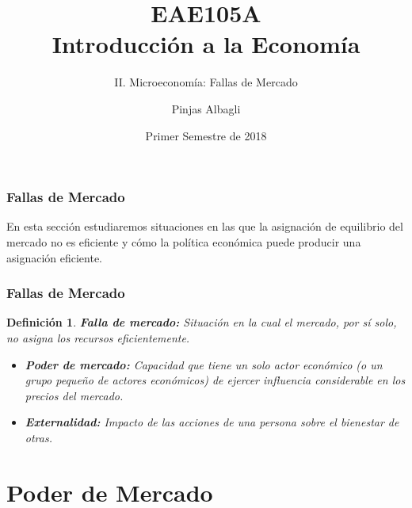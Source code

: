 \documentclass[dvipsnames,table,leqno]{beamer}
\title{EAE105A \\ Introducción a la Economía}
\subtitle{II. Microeconomía: Fallas de Mercado}
\author{Pinjas Albagli}
\institute{Instituto de Economía \\ Pontificia Universidad Católica de Chile}
\date{Primer Semestre de 2018}
\newtheorem{mydef}{Definición}
\begin{document}
	\maketitle 
	
		\begin{frame}
			\frametitle{Fallas de Mercado}
			En esta sección estudiaremos situaciones en las que la asignación de equilibrio del mercado no es eficiente y cómo la política económica puede producir una asignación eficiente.
		\end{frame}

		\begin{frame}
			\frametitle{Fallas de Mercado}
			\begin{mydef}
				\textbf{Falla de mercado:} Situación en la cual el mercado, por sí solo, no asigna los recursos eficientemente.
					\begin{itemize}
						\item \textbf{Poder de mercado:} Capacidad que tiene un solo actor económico (o un grupo pequeño de actores económicos) de ejercer influencia considerable en los precios del mercado.
						\item \textbf{Externalidad:} Impacto de las acciones de una persona sobre el bienestar de otras.
					\end{itemize}
			\end{mydef}
		\end{frame}
	
	\section{Poder de Mercado}
\end{document}
